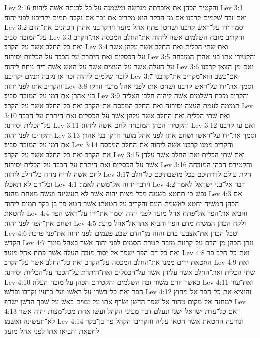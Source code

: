 Lev 2:16  והקטיר הכהן את־אזכרתה מגרשׂה ומשׁמנה על כל־לבנתה אשׁה ליהוה׃
Lev 3:1  ואם־זבח שׁלמים קרבנו אם מן־הבקר הוא מקריב אם־זכר אם־נקבה תמים יקריבנו לפני יהוה׃
Lev 3:2  וסמך ידו על־ראשׁ קרבנו ושׁחטו פתח אהל מועד וזרקו בני אהרן הכהנים את־הדם על־המזבח סביב׃
Lev 3:3  והקריב מזבח השׁלמים אשׁה ליהוה את־החלב המכסה את־הקרב ואת כל־החלב אשׁר על־הקרב׃
Lev 3:4  ואת שׁתי הכלית ואת־החלב אשׁר עלהן אשׁר על־הכסלים ואת־היתרת על־הכבד על־הכליות יסירנה׃
Lev 3:5  והקטירו אתו בני־אהרן המזבחה על־העלה אשׁר על־העצים אשׁר על־האשׁ אשׁה ריח ניחח ליהוה׃
Lev 3:6  ואם־מן־הצאן קרבנו לזבח שׁלמים ליהוה זכר או נקבה תמים יקריבנו׃
Lev 3:7  אם־כשׂב הוא־מקריב את־קרבנו והקריב אתו לפני יהוה׃
Lev 3:8  וסמך את־ידו על־ראשׁ קרבנו ושׁחט אתו לפני אהל מועד וזרקו בני אהרן את־דמו על־המזבח סביב׃
Lev 3:9  והקריב מזבח השׁלמים אשׁה ליהוה חלבו האליה תמימה לעמת העצה יסירנה ואת־החלב המכסה את־הקרב ואת כל־החלב אשׁר על־הקרב׃
Lev 3:10  ואת שׁתי הכלית ואת־החלב אשׁר עלהן אשׁר על־הכסלים ואת־היתרת על־הכבד על־הכלית יסירנה׃
Lev 3:11  והקטירו הכהן המזבחה לחם אשׁה ליהוה׃
Lev 3:12  ואם עז קרבנו והקריבו לפני יהוה׃
Lev 3:13  וסמך את־ידו על־ראשׁו ושׁחט אתו לפני אהל מועד וזרקו בני אהרן את־דמו על־המזבח סביב׃
Lev 3:14  והקריב ממנו קרבנו אשׁה ליהוה את־החלב המכסה את־הקרב ואת כל־החלב אשׁר על־הקרב׃
Lev 3:15  ואת שׁתי הכלית ואת־החלב אשׁר עלהן אשׁר על־הכסלים ואת־היתרת על־הכבד על־הכלית יסירנה׃
Lev 3:16  והקטירם הכהן המזבחה לחם אשׁה לריח ניחח כל־חלב ליהוה׃
Lev 3:17  חקת עולם לדרתיכם בכל מושׁבתיכם כל־חלב וכל־דם לא תאכלו׃
Lev 4:1  וידבר יהוה אל־משׁה לאמר׃
Lev 4:2  דבר אל־בני ישׂראל לאמר נפשׁ כי־תחטא בשׁגגה מכל מצות יהוה אשׁר לא תעשׂינה ועשׂה מאחת מהנה׃
Lev 4:3  אם הכהן המשׁיח יחטא לאשׁמת העם והקריב על חטאתו אשׁר חטא פר בן־בקר תמים ליהוה לחטאת׃
Lev 4:4  והביא את־הפר אל־פתח אהל מועד לפני יהוה וסמך את־ידו על־ראשׁ הפר ושׁחט את־הפר לפני יהוה׃
Lev 4:5  ולקח הכהן המשׁיח מדם הפר והביא אתו אל־אהל מועד׃
Lev 4:6  וטבל הכהן את־אצבעו בדם והזה מן־הדם שׁבע פעמים לפני יהוה את־פני פרכת הקדשׁ׃
Lev 4:7  ונתן הכהן מן־הדם על־קרנות מזבח קטרת הסמים לפני יהוה אשׁר באהל מועד ואת כל־דם הפר ישׁפך אל־יסוד מזבח העלה אשׁר־פתח אהל מועד׃
Lev 4:8  ואת־כל־חלב פר החטאת ירים ממנו את־החלב המכסה על־הקרב ואת כל־החלב אשׁר על־הקרב׃
Lev 4:9  ואת שׁתי הכלית ואת־החלב אשׁר עליהן אשׁר על־הכסלים ואת־היתרת על־הכבד על־הכליות יסירנה׃
Lev 4:10  כאשׁר יורם משׁור זבח השׁלמים והקטירם הכהן על מזבח העלה׃
Lev 4:11  ואת־עור הפר ואת־כל־בשׂרו על־ראשׁו ועל־כרעיו וקרבו ופרשׁו׃
Lev 4:12  והוציא את־כל־הפר אל־מחוץ למחנה אל־מקום טהור אל־שׁפך הדשׁן ושׂרף אתו על־עצים באשׁ על־שׁפך הדשׁן ישׂרף׃
Lev 4:13  ואם כל־עדת ישׂראל ישׁגו ונעלם דבר מעיני הקהל ועשׂו אחת מכל־מצות יהוה אשׁר לא־תעשׂינה ואשׁמו׃
Lev 4:14  ונודעה החטאת אשׁר חטאו עליה והקריבו הקהל פר בן־בקר לחטאת והביאו אתו לפני אהל מועד׃

